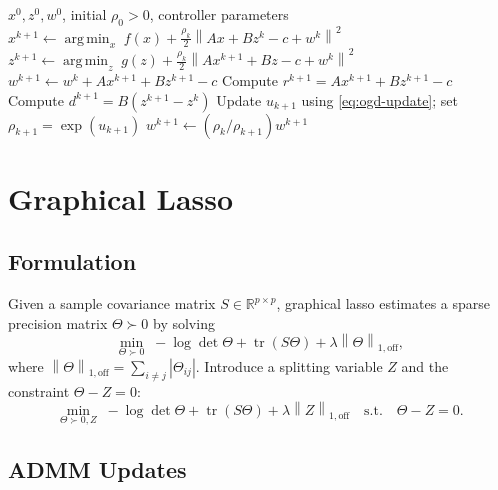 \documentclass[11pt]{article}
\newcommand{\R}{\mathbb{R}}
\newcommand{\argmin}{\operatorname*{arg\,min}}
\newcommand{\tr}{\operatorname{tr}}
\newcommand{\norm}[1]{\left\lVert #1 \right\rVert}
\begin{document}
\begin{algorithm}[t]
\caption{Exact scaled ADMM with online penalty control}
\label{alg:generic-online-admm}
\begin{algorithmic}[1]
\Require $x^0,z^0,w^0$, initial $\rho_0>0$, controller parameters
    \State $x^{k+1} \gets \argmin_x\; f(x)+\frac{\rho_k}{2}
    \norm{Ax+Bz^k-c+w^k}^2$
    \State $z^{k+1} \gets \argmin_z\; g(z)+\frac{\rho_k}{2}
    \norm{Ax^{k+1}+Bz-c+w^k}^2$
    \State $w^{k+1} \gets w^k + Ax^{k+1}+Bz^{k+1}-c$
    \State Compute $r^{k+1}=Ax^{k+1}+Bz^{k+1}-c$
    \State Compute $d^{k+1}=B(z^{k+1}-z^k)$
    \State Update $u_{k+1}$ using \eqref{eq:ogd-update};
           set $\rho_{k+1}=\exp(u_{k+1})$
        \State $w^{k+1}\gets(\rho_k/\rho_{k+1})w^{k+1}$
    \EndIf
\EndFor
\end{algorithmic}
\end{algorithm}

\section{Graphical Lasso}

\subsection{Formulation}

Given a sample covariance matrix $S\in\R^{p\times p}$, graphical lasso
estimates a sparse precision matrix $\Theta\succ 0$ by solving
\begin{equation}
    \min_{\Theta\succ 0}\;
    -\log\det \Theta
    + \tr(S\Theta)
    + \lambda \norm{\Theta}_{1,\mathrm{off}},
    \label{eq:glasso}
\end{equation}
where $\norm{\Theta}_{1,\mathrm{off}}=\sum_{i\neq j}|\Theta_{ij}|$.
Introduce a splitting variable $Z$ and the constraint $\Theta-Z=0$:
\begin{equation}
    \min_{\Theta\succ0,Z}\;
    -\log\det\Theta+\tr(S\Theta)
    +\lambda\norm{Z}_{1,\mathrm{off}}
    \quad \text{s.t.}\quad \Theta-Z=0 .
\end{equation}

\subsection{ADMM Updates}
\end{document}

